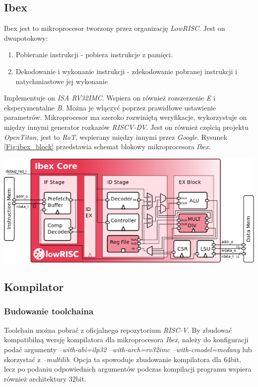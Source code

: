 \documentclass[11pt,a4paper]{article}
\begin{document}
	\subsection{Ibex}
	\hspace{5mm}
		Ibex jest to mikroprocesor tworzony przez organizację \textit{LowRISC}. Jest on dwupotokowy:
\begin{enumerate}
	\item Pobieranie instrukcji - pobiera instrukcje z pamięci.
	\item Dekodowanie i wykonanie instrukcji - zdekodowanie pobranej instrukcji i natychmiastowe jej wykonanie
\end{enumerate}		
		 Implementuje on \textit{ISA RV32IMC}. Wspiera on również rozszerzenie \textit{E} i eksperymentalne \textit{B}. Można je włączyć poprzez prawidłowe ustawienie parametrów\cite{ibex_doc}. Mikroprocesor ma szeroko rozwiniętą weryfikacje, wykorzystuje on między innymi generator rozkazów \textit{RISCV-DV}. Jest on również częścią projektu \textit{OpenTitan}, jest to \textit{RoT}, wspierany między innymi przez \textit{Google}\cite{google_opentitan}.
		Rysunek \ref{Fig:ibex_block} przedstawia schemat blokowy mikroprocesora \textit{Ibex}\cite{ibex_doc}.\\
			\begin{minipage}{\textwidth}
				\nopagebreak
				\begin{center}
					\includegraphics[width=14cm]{./rysunki/blockdiagram.png}
				\end{center}
			\end{minipage}
	\subsection{Kompilator}
		\subsubsection{Budowanie toolchaina}
		\hspace{5mm}
			Toolchain można pobrać z oficjalnego repozytorium \textit{RISC-V}\cite{toolchain}. By zbudować kompatibilną wersję kompilatora dla mikroprocesora \textit{Ibex}, należy do konfiguracji podać argumenty \textit{--with-abi=ilp32 --with-arch=rv32imc --with-cmodel=medany} lub skorzystać z \textit{--multilib}. Opcja ta spowoduje zbudowanie kompilatora dla 64bit, lecz po podaniu odpowiednich argumentów podczas kompilacji programu wspiera również architektury 32bit.
\end{document}
